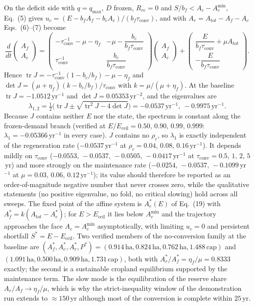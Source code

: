 \documentclass[11pt,a4paper]{article}
\newcommand{\Eceil}{E_{\mathrm{ceil}}}
\newcommand{\Acmin}{A_c^{\min}}
\newcommand{\tconv}{\tau_{\mathrm{conv}}}
\begin{document}
On the deficit side with $q=q_{\max}$, $D$ frozen, $R_{rc}=0$ and $S/b_f<A_c-\Acmin$, Eq.~(5) gives $u_c=(E-b_fA_f-b_cA_c)/(b_f\tconv)$, and with $A_r=A_{tot}-A_f-A_c$ Eqs.~(6)--(7) become
\begin{equation}
\frac{d}{dt}\begin{pmatrix}A_f\\A_c\end{pmatrix}=
\begin{pmatrix}-\tconv^{-1}-\mu-\eta_f & -\mu-\dfrac{b_c}{b_f\tconv}\\[8pt]\tconv^{-1} & \dfrac{b_c}{b_f\tconv}\end{pmatrix}
\begin{pmatrix}A_f\\A_c\end{pmatrix}+
\begin{pmatrix}\dfrac{E}{b_f\tconv}+\mu A_{tot}\\[8pt]-\dfrac{E}{b_f\tconv}\end{pmatrix}.
\end{equation}
Hence $\operatorname{tr}J=-\tconv^{-1}(1-b_c/b_f)-\mu-\eta_f$ and $\det J=(\mu+\eta_f)(k-b_c/b_f)/\tconv$ with $k=\mu/(\mu+\eta_f)$. At the baseline $\operatorname{tr}J=-1.0512\,\mathrm{yr}^{-1}$ and $\det J=0.05353\,\mathrm{yr}^{-2}$, and the eigenvalues are
\begin{equation}
\lambda_{1,2}=\tfrac12\Big(\operatorname{tr}J\pm\sqrt{\operatorname{tr}^2J-4\det J}\Big)=-0.0537\,\mathrm{yr}^{-1},\ -0.9975\,\mathrm{yr}^{-1}.
\end{equation}
Because $J$ contains neither $E$ nor the state, the spectrum is constant along the frozen-demand branch (verified at $E/\Eceil=0.50,\,0.90,\,0.99,\,0.999$: $\lambda_1=-0.05366\,\mathrm{yr}^{-1}$ in every case). $J$ contains no $\rho_c$, so $\lambda_1$ is exactly independent of the regeneration rate ($-0.0537\,\mathrm{yr}^{-1}$ at $\rho_c=0.04,\,0.08,\,0.16$\,yr$^{-1}$). It depends mildly on $\tconv$ ($-0.0553,\,-0.0537,\,-0.0505,\,-0.0417$\,yr$^{-1}$ at $\tconv=0.5,\,1,\,2,\,5$\,yr) and more strongly on the maintenance rate ($-0.0254,\,-0.0537,\,-0.1099$\,yr$^{-1}$ at $\mu=0.03,\,0.06,\,0.12$\,yr$^{-1}$); its value should therefore be reported as an order-of-magnitude negative number that never crosses zero, while the qualitative statements (no positive eigenvalue, no fold, no critical slowing) hold across all sweeps. The fixed point of the affine system is $A_c^*(E)$ of Eq.~(19) with $A_f^*=k(A_{tot}-A_c^*)$; for $E>\Eceil$ it lies below $\Acmin$ and the trajectory approaches the face $A_c=\Acmin$ asymptotically, with limiting $u_c=0$ and persistent shortfall $S^*=E-\Eceil$. Two verified members of the no-conversion family at the baseline are $(A_f^*,A_c^*,A_r^*,P^*)=(0.914\,\mathrm{ha},0.824\,\mathrm{ha},0.762\,\mathrm{ha},1.488\,\mathrm{cap})$ and $(1.091\,\mathrm{ha},0.500\,\mathrm{ha},0.909\,\mathrm{ha},1.731\,\mathrm{cap})$, both with $A_r^*/A_f^*=\eta_f/\mu=0.8333$ exactly; the second is a sustainable cropland equilibrium supported by the maintenance term. The slow mode is the equilibration of the reserve share $A_r/A_f\to\eta_f/\mu$, which is why the strict-inequality window of the demonstration run extends to $\approx150$\,yr although most of the conversion is complete within $25$\,yr.
\end{document}
